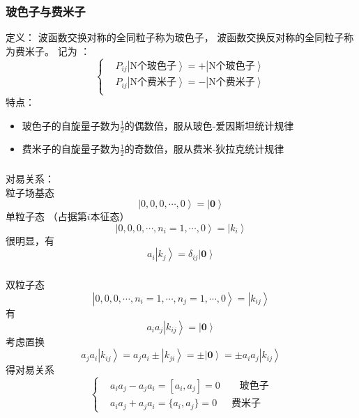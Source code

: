 \begin{frame}[label=current]
  \frametitle{玻色子与费米子}
  \alert{定义：} 波函数交换对称的全同粒子称为玻色子， 波函数交换反对称的全同粒子称为费米子。 记为 ：
  \[ \left\{\begin{aligned}
    & P_{ij}\left\vert \text{N个玻色子} \right\rangle = + \left\vert \text{N个玻色子} \right\rangle \\
    & P_{ij}\left\vert \text{N个费米子} \right\rangle = - \left\vert \text{N个费米子} \right\rangle \\ 
  \end{aligned}\right.
  \]
  \alert{特点：} 
  \begin{itemize}
    \item 玻色子的自旋量子数为$\frac{1}{2}$的偶数倍，服从玻色-爱因斯坦统计规律
    \item 费米子的自旋量子数为$\frac{1}{2}$的奇数倍，服从费米-狄拉克统计规律
  \end{itemize}     
\end{frame} 

\begin{frame}[label=current]
  \frametitle{}
  \alert{对易关系：} \\
粒子场基态 
\[ \left\vert 0,0,0,\cdots ,0 \right\rangle = \left\vert \mathbf{0} \right\rangle\]
单粒子态 （占据第$i$本征态）
\[\left\vert 0,0,0,\cdots, n_i =1 ,\cdots, 0 \right\rangle  = \left\vert k_i \right\rangle\]
很明显，有
\[ a_i \left\vert k_j \right\rangle = \delta _{ij} \left\vert \mathbf{0} \right\rangle \]
\end{frame} 

\begin{frame}[label=current]
  \frametitle{}
  双粒子态
  \[\left\vert 0,0,0,\cdots, n_i =1 ,\cdots, n_j =1 ,\cdots, 0 \right\rangle = \left\vert k_{ij} \right\rangle\]
  有
  \[ a_i a_j \left\vert k_{ij} \right\rangle = \left\vert \mathbf{0} \right\rangle \]
  考虑置换
  \[ 
    a_j a_i \left\vert k_{ij} \right\rangle = a_j a_i \pm \left\vert k_{ji} \right\rangle
    = \pm  \left\vert \mathbf{0} \right\rangle  =  \pm  a_i a_j \left\vert k_{ij} \right\rangle
  \] 
  得对易关系
\[\left\{ \begin{aligned}
  &a_i  a_j  - a_j  a_i  = [a_i , a_j ] = 0 \qquad \text{玻色子} \\
  &a_i  a_j  + a_j  a_i  = \{ a_i , a_j \} = 0 \quad \,\,\, \text{费米子} 
\end{aligned}\right.\]
\end{frame} 

